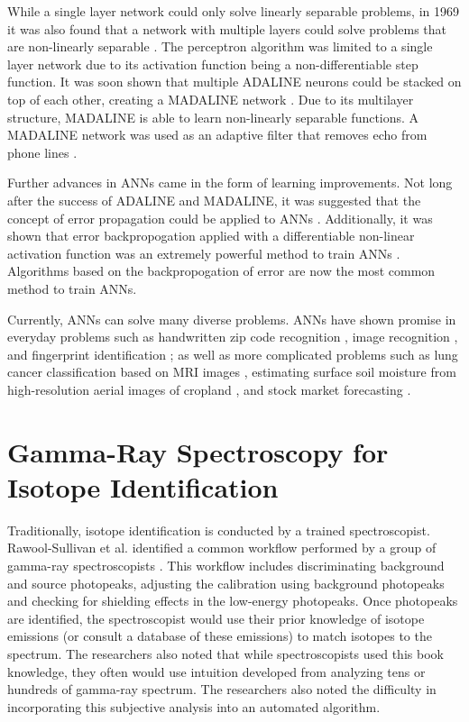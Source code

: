 While a single layer network could only solve linearly separable problems, in 1969 it was also found that a network with multiple layers could solve problems that are non-linearly separable \cite{Minsky1969}. The perceptron algorithm was limited to a single layer network due to its activation function being a non-differentiable step function. It was soon shown that multiple ADALINE neurons could be stacked on top of each other, creating a MADALINE network \cite{Ridgway1962}. Due to its multilayer structure, MADALINE is able to learn non-linearly separable functions. A MADALINE network was used as an adaptive filter that removes echo from phone lines \cite{Widrow1988}.

Further advances in ANNs came in the form of learning improvements. Not long after the success of ADALINE and MADALINE, it was suggested that the concept of error propagation could be applied to ANNs \cite{Werbos1974, Rumelhart1986}. Additionally, it was shown that error backpropogation applied with a differentiable non-linear activation function was an extremely powerful method to train ANNs \cite{Murtagh1991}. Algorithms based on the backpropogation of error are now the most common method to train ANNs.

Currently, ANNs can solve many diverse problems. ANNs have shown promise in everyday problems such as handwritten zip code recognition \cite{LeCun1989}, image recognition \cite{Krizhevsky2012}, and fingerprint identification \cite{Jeyanthia2015}; as well as more complicated problems such as lung cancer classification based on MRI images \cite{Selvakumari2016}, estimating surface soil moisture from high-resolution aerial images of cropland \cite{Hassan-Esfahani2015}, and stock market forecasting \cite{Rababaah2015}.


\section{Gamma-Ray Spectroscopy for Isotope Identification}

Traditionally, isotope identification is conducted by a trained spectroscopist. Rawool-Sullivan et al. identified a common workflow performed by a group of gamma-ray spectroscopists \cite{Sullivan2010}. This workflow includes discriminating background and source photopeaks, adjusting the calibration using background photopeaks and checking for shielding effects in the low-energy photopeaks. Once photopeaks are identified, the spectroscopist would use their prior knowledge of isotope emissions (or consult a database of these emissions) to match isotopes to the spectrum. The researchers also noted that while  spectroscopists used this book knowledge, they often would use intuition developed from analyzing tens or hundreds of gamma-ray spectrum. The researchers also noted the difficulty in incorporating this subjective analysis into an automated algorithm.


